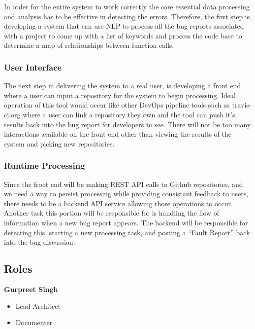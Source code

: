 \documentclass[11pt,]{article}
\begin{document}
In order for the entire system to work correctly the core essential data
processing and analysis has to be effective in detecting the errors.
Therefore, the first step is developing a system that can use NLP to
process all the bug reports associated with a project to come up with a
list of keywords and process the code base to determine a map of
relationships between function calls.

\hypertarget{user-interface}{%
\subsubsection{User Interface}\label{user-interface}}

The next step in delivering the system to a real user, is developing a
front end where a user can input a repository for the system to begin
processing. Ideal operation of this tool would occur like other DevOps
pipeline tools such as travis-ci.org where a user can link a repository
they own and the tool can push it's results back into the bug report for
developers to see. There will not be too many interactions available on
the front end other than viewing the results of the system and picking
new repositories.

\hypertarget{runtime-processing}{%
\subsubsection{Runtime Processing}\label{runtime-processing}}

Since the front end will be making REST API calls to Github
repositories, and we need a way to persist processing while providing
consistant feedback to users, there needs to be a backend API service
allowing those operations to occur. Another task this portion will be
responsible for is handling the flow of information when a new bug
report appears. The backend will be responsible for detecting this,
starting a new processing task, and posting a ``Fault Report'' back into
the bug discussion.

\hypertarget{roles}{%
\subsection{Roles}\label{roles}}

\textbf{Gurpreet Singh}

\begin{itemize}
\item
  Lead Architect
\item
  Documenter
\end{itemize}
\end{document}
